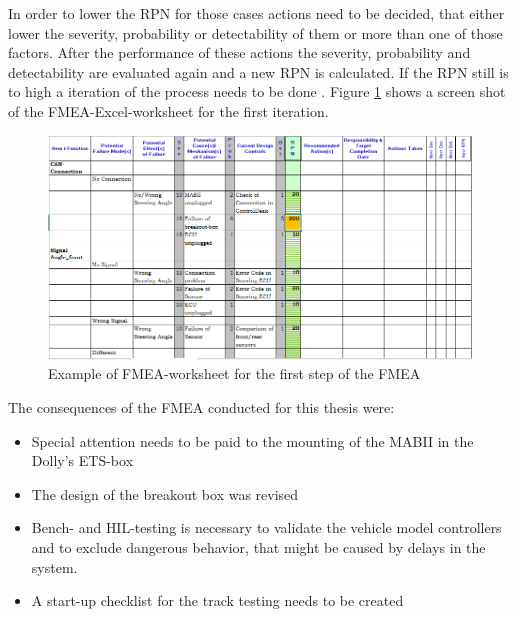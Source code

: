 \documentclass[ExampleMasters.tex]{subfiles}
\begin{document}
In order to lower the \gls{RPN} for those cases actions need to be decided, that either lower the severity, probability or detectability of them or more than one of those factors. After the performance of these actions the severity, probability and detectability are evaluated again and a new \gls{RPN} is calculated. If the \gls{RPN} still is to high a iteration of the process needs to be done \cite{din_60812_fmea}.
Figure \ref{fig:fmea_example} shows a screen shot of the FMEA-Excel-worksheet for the first iteration.    
\begin{figure}[!htb]
	\centering
	\includegraphics[width=1.0\linewidth]{figures/fmea_example}
	\caption{Example of \acrshort{FMEA}-worksheet for the first step of the \acrshort{FMEA}}
	\label{fig:fmea_example}
\end{figure}
The consequences of the \gls{FMEA} conducted for this thesis were:\\
\begin{itemize}
	\item Special attention needs to be paid to the mounting of the \gls{MABII} in the Dolly's \gls{ETS}-box
	\item The design of the breakout box was revised
	\item Bench- and \gls{HIL}-testing is necessary to validate  the vehicle model controllers and to exclude dangerous behavior, that might be caused by delays in the system. 
	\item A start-up checklist for the track testing needs to be created	 
\end{itemize}  
\end{document}
